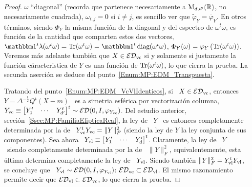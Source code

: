 \begin{proof}
  $\omega$    ``diagonal''    (recorda    que   partenece    necesariamente    a
  $\mathrm{M}_{d,d'}(\mathbb{R})$, \ie no necesariamente  cuadrada), \ie $\omega_{i,j} = 0$
  si   $i    \ne   j$,   es   sencillo   ver    que   $\widetilde{\varphi}_Y   =
  \overline{\varphi}_Y$. En otros t\'erminos, siendo $\Phi_Y$ la misma funci\'on
  de  la diagonal  y  del espectro  de  $\omega^t \omega$,  es  funci\'on de  la
  cantidad que comparten estos dos vectores, \ie $\un^t \lambda(\omega^t \omega)
  = \Tr( \omega^t \omega) = \un^t \diag(\omega^t \omega)$, \ie $\Phi_Y(\omega) =
  \varphi_Y\left(  \operatorname{Tr}(\omega^t   \omega)  \right)$.   Veremos   m\'as  adelante
  tambi\'en  que $X \in  \mathcal{ED}_{\mathrm{vc}}$ si  y solamente  si justamente  la funci\'on
  c\'aracteristica de  $Y$ es una funci\'on  de $\operatorname{Tr}( \omega^t  \omega)$, lo que
  cierra   la  prueba.    \newline   La  secunda   aserci\'on   se  deduce   del
  punto~\ref{Enum:MP:EDM_Transpuesta}.

  Tratando  del punto~\ref{Enum:MP:EDM_VcVlIdenticos}, si  \ $X  \in \mathcal{ED}_{\mathrm{vc}}$,
  entonces \  $Y = \Delta^{-\frac12} Q^t  (X-m)$ \ es a  simetria esf\'erica por
  vectorizaci\'on columna, \ie \  $Y_{\mathrm{vc}} \equiv \begin{bmatrix} Y_1^t & \cdots
    &  Y_{d'}^t \end{bmatrix}^t  \sim  \mathcal{ED}(0,I,\varphi_{Y_{\mathrm{vc}}})$. Del  estudio
  anterior, secci\'on~\ref{Ssec:MP:FamiliaElipticaReal},  la ley  de \ $Y$  \ es
  entonces  completamente determinada  por la  de \  $Y_{\mathrm{vc}}^t Y_{\mathrm{vc}}  =  \| Y
  \|_F^2$ (siendo la ley de $Y$ la ley conjunta de sus componentes). Sea ahora \
  $Y_{\mathrm{vl}}  \equiv  \begin{bmatrix}  Y'_1  &  \cdots  &  Y'_d  \end{bmatrix}^t$.
  Claramente, la ley de \ $Y$ \ siendo completamente determinada por la de \ $\|
  Y \|_F^2$, equivalentemente, esta \'ultima determina completamente la ley de \
  $Y_{\mathrm{vl}}$. Siendo tambi\'en $\| Y \|_F^2 = Y_{\mathrm{vl}}^t Y_{\mathrm{vl}}$, se concluye que
  \  $Y_{\mathrm{vl}} \sim  \mathcal{ED}(0,I,\varphi_{Y_{\mathrm{vl}}})$: $\mathcal{ED}_{\mathrm{vc}}  \subset \mathcal{ED}_{\mathrm{vl}}$.
  El mismo razonamiento permite decir  que $\mathcal{ED}_{\mathrm{vl}} \subset \mathcal{ED}_{\mathrm{vc}}$, lo que
  cierra la prueba.


\end{proof}
